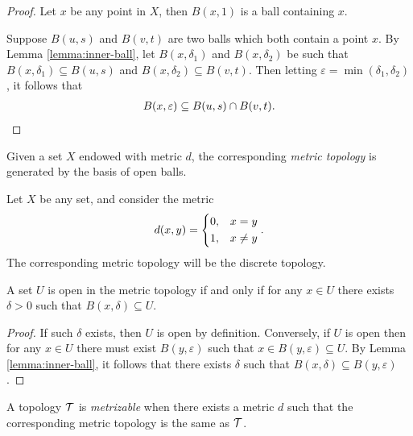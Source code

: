 \begin{proof}
    Let $x$ be any point in $X$, then $B(x, 1)$ is a ball containing $x$.

    Suppose $B(u, s)$ and $B(v, t)$ are two balls which both contain a point $x$. By Lemma \ref{lemma:inner-ball}, let $B(x, \delta_1)$ and $B(x, \delta_2)$ be such that $B(x, \delta_1) \subseteq B(u, s)$ and $B(x, \delta_2) \subseteq B(v, t)$. Then letting $\varepsilon = \min(\delta_1,\delta_2)$, it follows that
    \begin{align*}
        B(x, \varepsilon) \subseteq B(u, s) \cap B(v, t).
    \end{align*}
\end{proof}

\begin{defn}
    Given a set $X$ endowed with metric $d$, the corresponding \emph{metric topology} is generated by the basis of open balls.
\end{defn}

\begin{exmp}
    Let $X$ be any set, and consider the metric
    \begin{align*}
        d(x, y) = \begin{dcases}
            0, &x = y \\
            1, &x \neq y
        \end{dcases}.
    \end{align*}
    The corresponding metric topology will be the discrete topology.
\end{exmp}

\begin{lemma}
    A set $U$ is open in the metric topology if and only if for any $x \in U$ there exists $\delta > 0$ such that $B(x, \delta) \subseteq U$.
\end{lemma}

\begin{proof}
    If such $\delta$ exists, then $U$ is open by definition. Conversely, if $U$ is open then for any $x \in U$ there must exist $B(y, \varepsilon)$ such that $x \in B(y, \varepsilon) \subseteq U$. By Lemma \ref{lemma:inner-ball}, it follows that there exists $\delta$ such that $B(x, \delta) \subseteq B(y, \varepsilon)$.
\end{proof}

\begin{defn}
    A topology $\mathcal{T}$ is \emph{metrizable} when there exists a metric $d$ such that the corresponding metric topology is the same as $\mathcal{T}$.
\end{defn}

